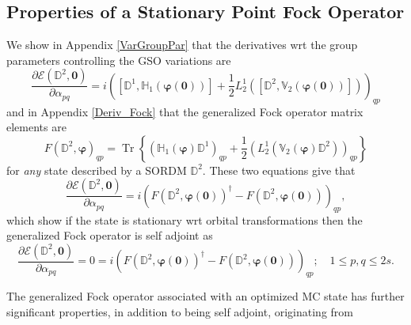 \documentclass[titlepage]{article}%
\begin{document}
\subsection{Properties of a Stationary Point Fock Operator\label{Stat_Fock}}

We show in Appendix \ref{VarGroupPar} that the derivatives wrt the group
parameters controlling the GSO variations are
\begin{equation}
\frac{\partial\mathcal{E}\left(  \mathbb{D}^{2},\bm{0}\right)  }%
{\partial\alpha_{pq}}=i\left(  \left[  \mathbb{D}^{1},\mathbb{H}_{1}\left(
\bm{\varphi}\left(  \bm{0}\right)  \right)  \right]  +\frac{1}{2}L_{2}%
^{1}\left(  \left[  \mathbb{D}^{2},\mathbb{V}_{2}\left(  \bm{\varphi }\left(
\bm{0}\right)  \right)  \right]  \right)  \right)  _{qp}%
\end{equation}
and in Appendix \ref{Deriv_Fock} that the generalized Fock operator matrix
elements are
\begin{equation}
F\left(  \mathbb{D}^{2},\bm{\varphi}\right)  _{qp}=\operatorname{Tr}\left\{
\left(  \mathbb{H}_{1}\left(  \bm{\varphi}\right)  \mathbb{D}^{1}\right)
_{qp}+\frac{1}{2}\left(  L_{2}^{1}\left(  \mathbb{V}_{2}\left(
\bm{\varphi}\right)  \mathbb{D}^{2}\right)  \right)  _{qp}\right\}
\end{equation}
for \emph{any} state described by a SORDM $\mathbb{D}^{2}$. These two
equations give that
\begin{equation}
\frac{\partial\mathcal{E}\left(  \mathbb{D}^{2},\bm{0}\right)  }%
{\partial\alpha_{pq}}=i\left(  F\left(  \mathbb{D}^{2},\bm{\varphi}\left(
\bm{0}\right)  \right)  ^{\dagger}-F\left(  \mathbb{D}^{2}%
,\bm{\varphi }\left(  \bm{0}\right)  \right)  \right)  _{qp},
\end{equation}
which show if the state is stationary wrt orbital transformations then the
generalized Fock operator is self adjoint as
\begin{equation}
\frac{\partial\mathcal{E}\left(  \mathbb{D}^{2},\bm{0}\right)  }%
{\partial\alpha_{pq}}=0=i\left(  F\left(  \mathbb{D}^{2},\bm{\varphi }\left(
\bm{0}\right)  \right)  ^{\dagger}-F\left(  \mathbb{D}^{2},\bm{\varphi}\left(
\bm{0}\right)  \right)  \right)  _{qp};\quad1\leq p,q\leq2s.
\end{equation}


The generalized Fock operator associated with an optimized MC state has
further significant properties, in addition to being self adjoint, originating from
\end{document}
